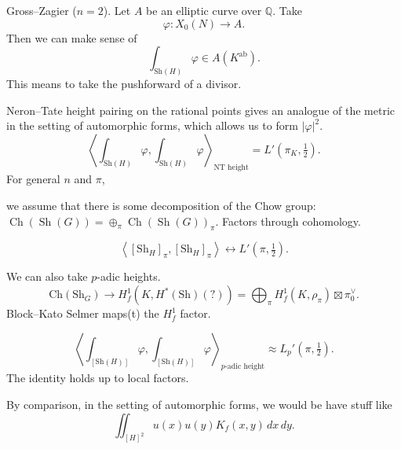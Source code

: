 \documentclass[reqno]{amsart} 
\begin{document}
\begin{example}
  Gross--Zagier ($n = 2$).  Let $A$ be an elliptic curve over $\mathbb{Q}$.  Take
  \begin{equation*}
    \varphi : X_0(N) \rightarrow A.
  \end{equation*}
  Then we can make sense of
  \begin{equation*}
    \int_{\mathrm{Sh}(H)} \varphi \in A(K^{\mathrm{ab}}).
  \end{equation*}
  This means to take the pushforward of a divisor.

  Neron--Tate height pairing on the rational points gives an analogue of the metric in the setting of automorphic forms, which allows us to form $\lvert \varphi \rvert^2$.
  \begin{equation*}
    \left\langle
      \int_{\mathrm{Sh}(H)} \varphi,
      \int_{\mathrm{Sh}(H)} \varphi
    \right\rangle_{\mathrm{NT} \text{ height}} = L '(\pi_K, \tfrac{1}{2}).
  \end{equation*}
  For general $n$ and $\pi$,

  we assume that there is some decomposition of the Chow group: $\operatorname{Ch}(\operatorname{Sh}(G)) = \oplus_\pi \operatorname{Ch}(\operatorname{Sh}(G))_\pi$.  Factors through cohomology.
  
  \begin{equation*}
    \left\langle [\mathrm{Sh}_H]_\pi, [\mathrm{Sh}_H]_\pi \right\rangle
    \leftrightarrow
    L '(\pi, \tfrac{1}{2}).
  \end{equation*}

  We can also take $p$-adic heights.
  \begin{equation*}
    \mathrm{Ch}(\mathrm{Sh}_G) \rightarrow  H^1_f(K, H^\ast(\mathrm{Sh})(?))
    = \bigoplus_\pi H_f^1(K, \rho_\pi) \boxtimes \pi_0^\vee.
  \end{equation*}
  Block--Kato Selmer maps(t) the $H^1_f$ factor.

  \begin{theorem}
    \begin{equation*}
      \left\langle \int_{[\mathrm{Sh}(H)]} \varphi, \int_{[\mathrm{Sh}(H)]} \varphi \right\rangle_{\text{$p$-adic height}}
      \approx L_p '(\pi , \tfrac{1}{2}).
    \end{equation*}
    The identity holds up to local factors.
  \end{theorem}

  By comparison, in the setting of automorphic forms, we would be have stuff like
  \begin{equation*}
    \iint_{[H]^2 } u(x) u(y) K_f(x,y) \, d x \, d y.
  \end{equation*}

  
\end{example}
\end{document}
